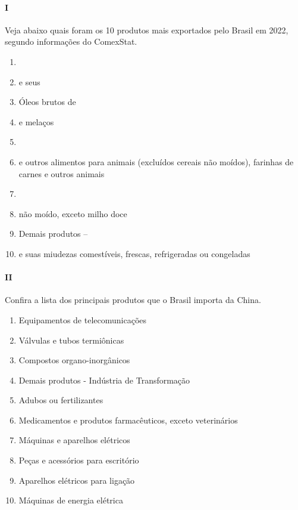 \paragraph{I} Veja abaixo quais foram os 10 produtos mais exportados pelo Brasil em
2022, segundo informações do ComexStat.

\begin{enumerate}
\item {}
\item {} e seus
\item Óleos brutos de 
\item {} e melaços
\item {}
\item {} e outros alimentos para animais (excluídos cereais não
  moídos), farinhas de carnes e outros animais
\item {}
\item {} não moído, exceto milho doce
\item Demais produtos -- 
\item {} e suas miudezas comestíveis, frescas, refrigeradas ou congeladas
\end{enumerate}


\paragraph{II} Confira a lista dos principais produtos que o Brasil importa da China.

\begin{enumerate}
\item
  Equipamentos de telecomunicações
\item
  Válvulas e tubos termiônicas
\item
  Compostos organo-inorgânicos
\item
  Demais produtos - Indústria de Transformação
\item
  Adubos ou fertilizantes
\item
  Medicamentos e produtos farmacêuticos, exceto veterinários
\item
  Máquinas e aparelhos elétricos
\item
  Peças e acessórios para escritório
\item
  Aparelhos elétricos para ligação
\item
  Máquinas de energia elétrica
\end{enumerate}

